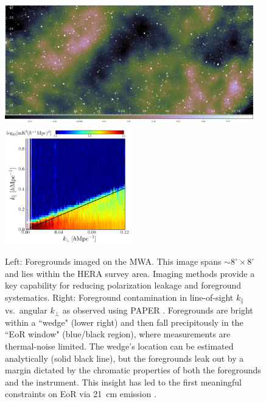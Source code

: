 \documentclass[preprint]{aastex}
\def\kperp{k_{\bot}}
\def\kpar{k_{\|}}
\def\kperp{k_{\bot}}
\def\kpar{k_{\|}}
\begin{document}
\begin{figure}[!ht] \centering
\includegraphics[height=2.02in]{plots/Foregrounds/MWA_EoR0_2min.jpg}
\includegraphics[height=2.02in]{plots/wedge_tall_wide.png} \caption{\small Left:
Foregrounds imaged on the MWA.
This image spans $\sim$$8^{\circ} \times 8^{\circ} $ and
lies within the HERA survey area. Imaging methods provide a key capability for reducing
polarization leakage and foreground systematics.  
Right: Foreground contamination in line-of-sight $\kpar$ vs.\ angular $\kperp$
as observed using PAPER \citep{pober_et_al2013}.
Foregrounds are bright within a ``wedge" (lower right) and then fall 
precipitously in the ``EoR window" (blue/black 
region), where measurements are thermal-noise limited.  The wedge's location can 
be estimated analytically (solid black line), but the foregrounds leak out by a margin 
dictated by the chromatic properties of both the foregrounds and the instrument.
This insight has led to the
first meaningful constraints on EoR via 21~cm emission
\citep{parsons_et_al2013}.
}\label{fig:twoFGViews} \end{figure}
\end{document}
